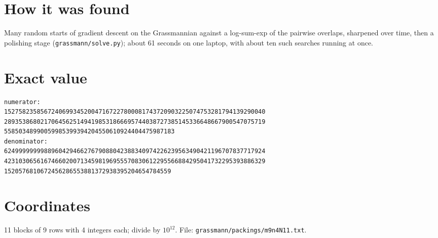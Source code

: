 \documentclass[11pt,a4paper]{article}
\begin{document}
\section{How it was found}
Many random starts of gradient descent on the Grassmannian against a log-sum-exp of the pairwise overlaps, sharpened over time, then a polishing stage (\texttt{grassmann/solve.py}); about 61 seconds on one laptop, with about ten such searches running at once.


\appendix
\section{Exact value}
{\small
\begin{verbatim}
numerator:
152758235856724069934520047167227800081743720903225074753281794139290040
289353868021706456251494198531866695744038727385145336648667900547075719
55850348990059985399394204550610924404475987183
denominator:
624999999998896042946627679088042388340974226239563490421196707837717924
423103065616746602007134598196955570830612295566884295041732295393886329
1520576810672456286553881372938395204654784559
\end{verbatim}}

\section{Coordinates}
11 blocks of 9 rows with 4 integers each; divide by $10^{12}$. File: \texttt{grassmann/packings/m9n4N11.txt}.
{\tiny
\begin{multicols}{3}
\end{multicols}}
\end{document}
